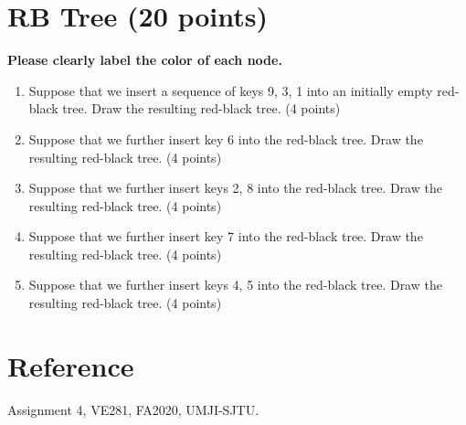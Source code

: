 \documentclass[11pt]{exam}
\begin{document}
\section{RB Tree (20 points)}
\textbf{Please clearly label the color of each node.}
    \begin{enumerate}[1.]
        \item Suppose that we insert a sequence of keys 9, 3, 1 into an initially empty red-black tree. Draw the resulting red-black tree. {\color{red}(4 points)}
        \begin{solution}
\end{solution}
        \item Suppose that we further insert key 6 into the red-black tree. Draw the resulting red-black tree. {\color{red}(4 points)}
        \begin{solution}
\end{solution}
        \item Suppose that we further insert keys 2, 8 into the red-black tree. Draw the resulting red-black tree. {\color{red}(4 points)}
        \begin{solution}
\end{solution}
        \item Suppose that we further insert key 7 into the red-black tree. Draw the resulting red-black tree. {\color{red}(4 points)}
        \begin{solution}
\end{solution}
        \item Suppose that we further insert keys 4, 5 into the red-black tree. Draw the resulting red-black tree. {\color{red}(4 points)}
        \begin{solution}
\end{solution}
    \end{enumerate}
\section*{Reference}
Assignment 4, VE281, FA2020, UMJI-SJTU.
\end{document}
